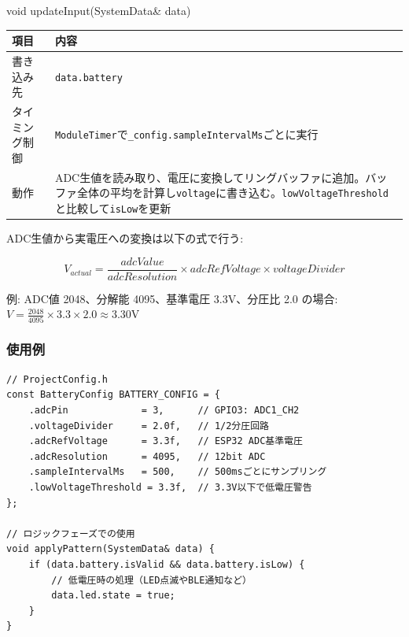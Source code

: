 \begin{funcblock}{void updateInput(SystemData\& data)}
\begin{tabularx}{\textwidth}{l X}
\toprule
\textbf{項目} & \textbf{内容} \\
\midrule
書き込み先     & \texttt{data.battery} \\
タイミング制御 & \texttt{ModuleTimer}で\texttt{\_config.sampleIntervalMs}ごとに実行 \\
動作           & ADC生値を読み取り、電圧に変換してリングバッファに追加。バッファ全体の平均を計算し\texttt{voltage}に書き込む。\texttt{lowVoltageThreshold}と比較して\texttt{isLow}を更新 \\
\bottomrule
\end{tabularx}
\end{funcblock}

\begin{notebox}[電圧変換式]
ADC生値から実電圧への変換は以下の式で行う:

\vspace{0.3em}
$$V_{actual} = \frac{adcValue}{adcResolution} \times adcRefVoltage \times voltageDivider$$
\vspace{0.3em}

\noindent 例: ADC値 2048、分解能 4095、基準電圧 3.3V、分圧比 2.0 の場合:
$V = \frac{2048}{4095} \times 3.3 \times 2.0 \approx 3.30$V
\end{notebox}

\subsubsection{使用例}

\begin{lstlisting}[style=cppstyle, caption={BatteryModuleの使用例}]
// ProjectConfig.h
const BatteryConfig BATTERY_CONFIG = {
    .adcPin             = 3,      // GPIO3: ADC1_CH2
    .voltageDivider     = 2.0f,   // 1/2分圧回路
    .adcRefVoltage      = 3.3f,   // ESP32 ADC基準電圧
    .adcResolution      = 4095,   // 12bit ADC
    .sampleIntervalMs   = 500,    // 500msごとにサンプリング
    .lowVoltageThreshold = 3.3f,  // 3.3V以下で低電圧警告
};

// ロジックフェーズでの使用
void applyPattern(SystemData& data) {
    if (data.battery.isValid && data.battery.isLow) {
        // 低電圧時の処理（LED点滅やBLE通知など）
        data.led.state = true;
    }
}
\end{lstlisting}
